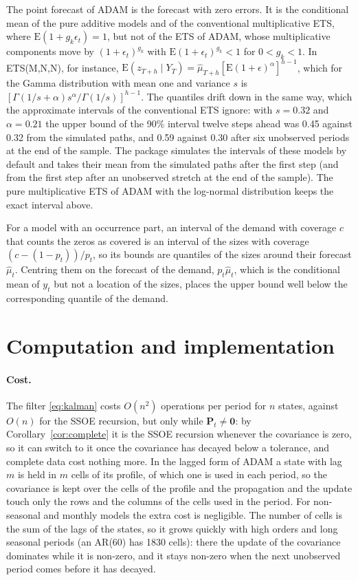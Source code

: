 \documentclass[11pt,a4paper]{article}
\newcommand{\vect}[1]{\mathbf{#1}}
\newcommand{\E}{\mathrm{E}}
\theoremstyle{remark}
\begin{document}
The point forecast of ADAM is the forecast with zero errors. It is the conditional mean of the pure
additive models and of the conventional multiplicative ETS, where $\E(1+g_k\epsilon_t) = 1$, but not
of the ETS of ADAM, whose multiplicative components move by $(1+\epsilon_t)^{g_k}$ with
$\E(1+\epsilon_t)^{g_k} < 1$ for $0 < g_k < 1$. In ETS(M,N,N), for instance,
$\E(z_{T+h}\mid Y_T) = \hat\mu_{T+h}\left[\E(1+\epsilon)^{\alpha}\right]^{h-1}$, which for the Gamma
distribution with mean one and variance $s$ is
$\left[\Gamma(1/s+\alpha)s^{\alpha}/\Gamma(1/s)\right]^{h-1}$. The quantiles drift down in the same
way, which the approximate intervals of the conventional ETS ignore: with $s = 0.32$ and
$\alpha = 0.21$ the upper bound of the 90\% interval twelve steps ahead was 0.45 against 0.32 from
the simulated paths, and 0.59 against 0.30 after six unobserved periods at the end of the sample.
The package simulates the intervals of these models by default and takes their mean from the
simulated paths after the first step (and from the first step after an unobserved stretch at the end
of the sample). The pure multiplicative ETS of ADAM with the log-normal distribution keeps the exact
interval above.

For a model with an occurrence part, an interval of the demand with coverage $c$ that counts the
zeros as covered is an interval of the sizes with coverage $(c - (1-p_t))/p_t$, so its bounds are
quantiles of the sizes around their forecast $\hat\mu_t$. Centring them on the forecast of the
demand, $p_t\hat\mu_t$, which is the conditional mean of $y_t$ but not a location of the sizes,
places the upper bound well below the corresponding quantile of the demand.

\section{Computation and implementation}
\label{sec:computation}

\paragraph{Cost.} The filter \eqref{eq:kalman} costs $O(n^2)$ operations per period for $n$
states, against $O(n)$ for the SSOE recursion, but only while $\vect P_t\neq\vect 0$: by
Corollary~\ref{cor:complete} it is the SSOE recursion whenever the covariance is zero, so it can
switch to it once the covariance has decayed below a tolerance, and complete data cost nothing more.
In the lagged form of ADAM a state with lag $m$ is held in $m$ cells of its profile, of which one is
used in each period, so the covariance is kept over the cells of the profile and the propagation and
the update touch only the rows and the columns of the cells used in the period. For non-seasonal and
monthly models the extra cost is negligible. The number of cells is the sum of the lags of the
states, so it grows quickly with high orders and long seasonal periods (an AR(60) has 1830 cells):
there the update of the covariance dominates while it is non-zero, and it stays non-zero when the
next unobserved period comes before it has decayed.
\end{document}

